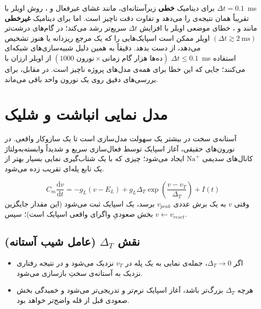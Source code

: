\documentclass[11pt,a4paper]{article}
\newcommand{\dd}{\mathrm{d}}
\begin{document}
\begin{keybox}
	برای دینامیک \textbf{خطی} زیرآستانه‌ای، مانند غشای غیرفعال و ، روش اویلر با
	$\Delta t=0.1$~ms
	تقریباً همان نتیجه‌ی  را می‌دهد و تفاوت دقت ناچیز است. اما برای دینامیک \textbf{غیرخطی} مانند  و ، خطای موضعی اویلر با افزایش $\Delta t$ سریع‌تر رشد می‌کند؛ در گام‌های درشت‌تر
	$(\Delta t \gtrsim 2~\text{ms})$
	اویلر ممکن است اسپایک‌هایی را که یک مرجع ریزدانه یا  هنوز تشخیص می‌دهد، از دست بدهد. دقیقاً به همین دلیل شبیه‌سازی‌های شبکه‌ای
	$(1000 \text{ نورون} \times \text{ده‌ها هزار گام زمانی})$
	از اویلر ارزان با
	$\Delta t \le 0.1$~ms
	استفاده می‌کنند؛ جایی که این خطا برای همه‌ی مدل‌های پروژه ناچیز است. در مقابل،  برای بررسی‌های دقیق روی یک نورون واحد باقی می‌ماند.
\end{keybox}

\section{مدل نمایی انباشت و شلیک }
آستانه‌ی سخت در  بیشتر یک سهولت مدل‌سازی است تا یک سازوکار واقعی. در نورون‌های حقیقی، آغاز اسپایک توسط فعال‌سازی سریع و شدیداً وابسته‌به‌ولتاژ کانال‌های سدیمی
$\text{Na}^+$
ایجاد می‌شود؛ چیزی که با یک شتاب‌گیری نمایی بسیار بهتر از یک تابع پله‌ای تقریب زده می‌شود.

\begin{eqbox}
	$$C_m \frac{\dd v}{\dd t} = -g_L(v - E_L) + g_L \Delta_T \exp\!\left(\frac{v - v_T}{\Delta_T}\right) + I(t)$$
	وقتی $v$ به یک برش عددی
	$v_{peak}$
	برسد، یک اسپایک ثبت می‌شود
	(این مقدار جایگزین بخش صعودیِ واگرای واقعی اسپایک است)؛ سپس
	$v \leftarrow v_{reset}$.
\end{eqbox}

\subsection{نقش \texorpdfstring{$\Delta_T$}{Delta\_T} (عامل شیب آستانه)}
\begin{itemize}[itemsep=2pt]
	\item اگر $\Delta_T \to 0$، جمله‌ی نمایی به یک پله در $v_T$ نزدیک می‌شود و در نتیجه رفتاری نزدیک به آستانه‌ی سختِ  بازسازی می‌شود.
	\item هرچه $\Delta_T$ بزرگ‌تر باشد، آغاز اسپایک نرم‌تر و تدریجی‌تر می‌شود و خمیدگی بخش صعودی قبل از قله واضح‌تر خواهد بود.
\end{itemize}
\end{document}
